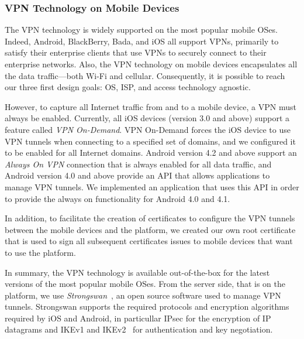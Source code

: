 \subsubsection{VPN Technology on Mobile Devices}
\label{sec:vpn-tech-mobile-device}
The VPN technology is widely supported on the most popular mobile
OSes. Indeed, Android, BlackBerry, Bada, and iOS all support VPNs,
primarily to satisfy their enterprise clients that use VPNs to
securely connect to their enterprise networks. Also, the VPN
technology on mobile devices encapsulates all the data traffic---both
Wi-Fi and cellular. Consequently, it is possible to reach our three
first design goals: OS, ISP, and access technology agnostic.

However, to capture all Internet traffic from and to a mobile device,
a VPN must always be enabled. Currently, all iOS devices (version 3.0
and above) support a feature called \textit{VPN On-Demand}.  VPN
On-Demand forces the iOS device to use VPN tunnels when connecting to
a specified set of domains, and we configured it to be enabled for all
Internet domains. Android version 4.2 and above support an
\textit{Always On VPN} connection that is always enabled for all data
traffic, and Android version 4.0 and above provide an API that allows
applications to manage VPN tunnels. We implemented an application that
uses this API in order to provide the always on functionality for
Android 4.0 and 4.1.

In addition, to facilitate the creation of certificates to configure
the VPN tunnels between the mobile devices and the \platname{}
platform, we created our own \platname{} root certificate that is used
to sign all subsequent certificates issues to mobile devices that want
to use the \platname{} platform. 

In summary, the VPN technology is available out-of-the-box for the
latest versions of the most popular mobile OSes. From the server side,
that is on the \platname{} platform, we use
\textit{Strongswan}~\cite{strongswan}, an open source software used to
manage VPN tunnels. Strongswan supports the required protocols and
encryption algorithms required by iOS and Android, in particullar
IPsec for the encryption of IP datagrams and IKEv1 and
IKEv2~\cite{rfc5996} for authentication and key negotiation.



